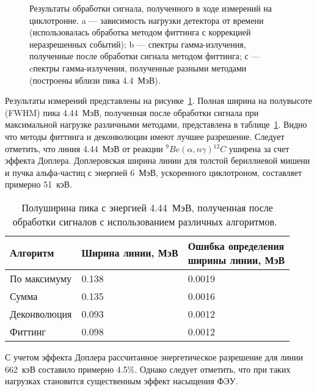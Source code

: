 \begin{figure}[ht!]
  \caption{ Результаты обработки сигнала, полученного в ходе измерений на циклотронне. a --- зависимость нагрузки детектора от времени (использовалась обработка методом фиттинга с коррекцией неразрешенных событий); b --- спектры гамма-излучения, полученные после обработки сигнала методом фиттинга; с --- cпектры гамма-излучения, полученные разными методами (построены вблизи пика 4.4~МэВ).~\cite{Khilkevitch2020} }
  \label{fig:processingCycloSignal}
\end{figure}

Результаты измерений представлены на рисунке~\ref{fig:processingCycloSignal}. Полная ширина на полувысоте (FWHM) пика 4.44~МэВ, полученная после обработки сигнала при максимальной нагрузке различными методами, представлена в таблице~\ref{tab:processingCycloSignal}. Видно что методы фиттинга и деконволюции имеют лучшее разрешение. Следует отметить, что линия 4.44~МэВ от реакции ${}^9Be(\alpha,n\gamma){}^{12}C$ уширена за счет эффекта Доплера. Доплеровская ширина линии для толстой бериллиевой мишени и пучка альфа-частиц с энергией 6~МэВ, ускоренного циклотроном, составляет примерно 51~кэВ.

\begin{table} [htbp]
    \centering
    \begin{threeparttable}
      \caption{ Полуширина пика с энергией 4.44~МэВ, полученная после обработки сигналов с использованием различных алгоритмов.~\cite{Khilkevitch2020} }
        \label{tab:processingCycloSignal}
        \begin{tabular}{| p{4cm} | p{6cm} | p{6cm} | }
            \hline
            Алгоритм   & Ширина линии, МэВ & \makecell{ Ошибка определения \\ ширины линии, МэВ } \\
            \hline
            По максимуму & 0.138 & 0.0019 \\
            Сумма &	0.135 &	0.0016\\
          Деконволюция &	0.093 &	0.0012 \\
          Фиттинг &	0.098 &	0.0012 \\
            \hline
        \end{tabular}
    \end{threeparttable}
\end{table}

С учетом эффекта Доплера рассчитанное энергетическое разрешение для линии 662~кэВ составило примерно 4.5\%. Однако следует отметить, что при таких нагрузках становится существенным эффект насыщения ФЭУ.


\FloatBarrier
